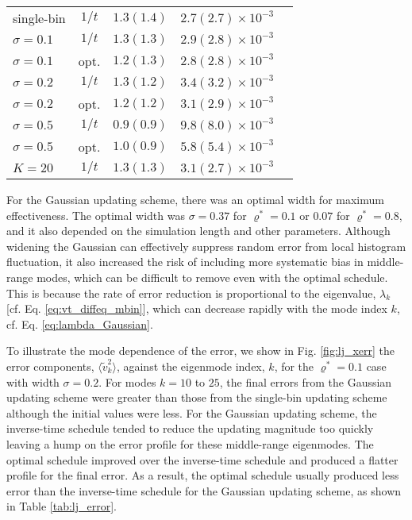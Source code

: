 \documentclass[reprint, superscriptaddress, floatfix]{revtex4-1}
\begin{document}
\begin{table}[h]
\begin{tabular} { l c c c c }
    \hline
    single-bin & $1/t$
    & $1.3(1.4)$
    & $2.7(2.7)\times10^{-3}$
    \\
    $\sigma=0.1$ & $1/t$
    & $1.3(1.3)$
    & $2.9(2.8)\times10^{-3}$
    \\
    $\sigma=0.1$ & opt.
    & $1.2(1.3)$
    & $2.8(2.8)\times10^{-3}$
    \\
    $\sigma=0.2$ & $1/t$
    & $1.3(1.2)$
    & $3.4(3.2)\times10^{-3}$
    \\
    $\sigma=0.2$ & opt.
    & $1.2(1.2)$
    & $3.1(2.9)\times10^{-3}$
    \\
    $\sigma=0.5$ & $1/t$
    & $0.9(0.9)$
    & $9.8(8.0)\times10^{-3}$
    \\
    $\sigma=0.5$ & opt.
    & $1.0(0.9)$
    & $5.8(5.4)\times10^{-3}$
    \\
    $K=20$ & $1/t$
    & $1.3(1.3)$
    & $3.1(2.7)\times10^{-3}$
    \\
    \hline
  \end{tabular}
\end{table}

For the Gaussian updating scheme,
there was an optimal width for maximum effectiveness.
%
The optimal width was $\sigma = 0.37$ for $\varrho^* = 0.1$
or $0.07$ for $\varrho^* = 0.8$,
and it also depended on the simulation length
and other parameters.
%
Although widening the Gaussian can
effectively suppress random error
from local histogram fluctuation,
it also increased the risk of including
more systematic bias in middle-range modes,
which can be difficult to remove
even with the optimal schedule.
%
This is because the rate of error reduction
is proportional to the eigenvalue, $\lambda_k$
[cf. Eq. \eqref{eq:vt_diffeq_mbin}],
which can decrease rapidly with the mode index $k$,
cf. Eq. \eqref{eq:lambda_Gaussian}.

To illustrate the mode dependence of the error,
we show in Fig. \ref{fig:lj_xerr}
the error components, $\langle \tilde v_k^2 \rangle$,
against the eigenmode index, $k$,
for the $\varrho^* = 0.1$ case
with width $\sigma = 0.2$.
%
For modes $k=10$ to $25$,
the final errors from the Gaussian updating scheme
were greater than those from the single-bin updating scheme
although the initial values were less.
%
For the Gaussian updating scheme,
the inverse-time schedule tended to
reduce the updating magnitude too quickly
leaving a hump on the error profile
for these middle-range eigenmodes.
%
The optimal schedule improved over the inverse-time schedule
and produced a flatter profile for the final error.
%
As a result, the optimal schedule usually produced
less error than the inverse-time schedule
for the Gaussian updating scheme,
as shown in Table \ref{tab:lj_error}.
\end{document}
